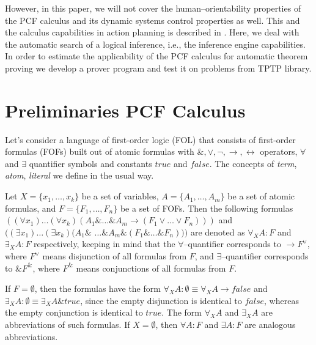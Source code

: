 \documentclass[runningheads,a4paper]{llncs}
\begin{document}
However, in this paper, we will not cover the human--orientability properties of the PCF calculus and its dynamic systems control properties as well.  This and the calculus capabilities in action planning is described in \cite{ICDS2000}.   Here, we deal with the automatic search of a logical inference, i.e., the inference engine capabilities.  In order to estimate the applicability of the PCF calculus for automatic theorem proving we develop a prover program and test it on problems from TPTP library.



\section{Preliminaries PCF Calculus}

Let's consider a language of first-order logic (FOL) that consists of first-order formulas (FOFs) built out of atomic formulas with $\&, \vee, \neg, \rightarrow, \leftrightarrow$ operators, $\forall$ and $\exists$ quantifier symbols and constants $true$ and $false$.  The concepts of \emph{term}, \emph{atom}, \emph{literal} we define in the usual way.

Let $X = \{x_1,\ldots,x_k\}$ be a set of variables, $A = \{A_1,\ldots,A_m\}$ be a set of atomic formulas, and $F = \{F_1,\ldots,F_n\}$ be a set of FOFs. Then the following formulas $((\forall x_1) \ldots (\forall x_k) (A_1 \& \ldots \& A_m \rightarrow (F_1 \vee \ldots \vee F_n)))$ and $((\exists x_1) \ldots (\exists x_k) (A_1 \&$ $\ldots \& A_m \& (F_1 \& \ldots \& F_n)))$ are denoted as  $\forall_XA\colon F$ and $\exists_XA\colon F$ respectively, keeping in mind that the $\forall$--quantifier corresponds to $\rightarrow F^{\vee}$, where $F^{\vee}$ means disjunction of all formulas from $F$, and $\exists$--quantifier corresponds to $\& F^{\&}$, where $F^{\&}$ means conjunctions of all formulas from $F$.

If $F = \emptyset$, then the formulas have the form $\forall_XA\colon\emptyset \equiv \forall_XA \rightarrow false$ and $\exists_XA\colon\emptyset \equiv \exists_XA \& true$, since the empty disjunction is identical to $false$, whereas the empty conjunction is identical to $true$.  The form $\forall_XA$ and $\exists_XA$ are abbreviations of such formulas.  If $X = \emptyset$, then $\forall A\colon F$ and $\exists A\colon F$ are analogous abbreviations.
\end{document}
